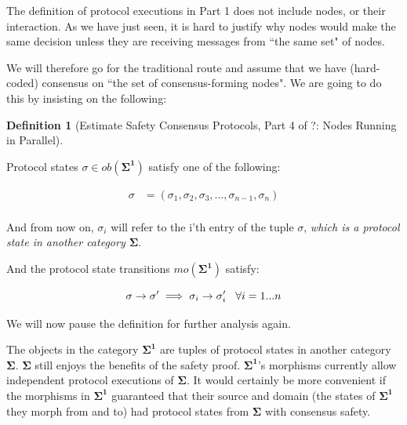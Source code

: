 \documentclass{article}
\theoremstyle{definition}
\newtheorem{defn}{Definition}[section]
\newcommand{\cat}{
	\mathbf
}
\begin{document}
The definition of protocol executions in Part 1 does not include nodes, or their interaction. As we have just seen, it is hard to justify why nodes would make the same decision unless they are receiving messages from ``the same set" of nodes.

We will therefore go for the traditional route and assume that we have (hard-coded) consensus on ``the set of consensus-forming nodes". We are going to do this by insisting on the following:

\begin{defn}[Estimate Safety Consensus Protocols, Part 4 of ?: Nodes Running in Parallel]
\begin{description}

Protocol states $\sigma \in ob(\cat{\Sigma^1})$ satisfy one of the following:

\begin{align*}
  \sigma &= (\sigma_1,\sigma_2,\sigma_3,...,\sigma_{n-1},\sigma_n)\\
\end{align*}

And from now on, $\sigma_i$ will refer to the i'th entry of the tuple $\sigma$, \emph{which is a protocol state in another category $\cat{\Sigma}$}.

And the protocol state transitions $mo(\cat{\Sigma^1})$ satisfy:

$$
\sigma \to \sigma' \implies \sigma_i \to \sigma'_i \hspace{3mm} \forall i=1...n
$$

We will now pause the definition for further analysis again.

\end{description}
\end{defn}

The objects in the category $\cat{\Sigma^1}$ are tuples of protocol states in another category $\cat{\Sigma}$. $\cat{\Sigma}$ still enjoys the benefits of the safety proof. $\cat{\Sigma^1}$'s morphisms currently allow independent protocol executions of $\cat{\Sigma}$. It would certainly be more convenient if the morphisms in $\cat{\Sigma^1}$ guaranteed that their source and domain (the states of $\cat{\Sigma^1}$ they morph from and to) had protocol states from $\cat{\Sigma}$ with consensus safety.
\end{document}
